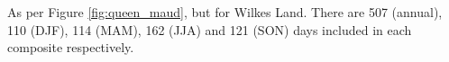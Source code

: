 \label{fig:wilkes}
As per Figure \ref{fig:queen_maud}, but for Wilkes Land. There are 507 (annual), 110 (DJF), 114 (MAM), 162 (JJA) and 121 (SON) days included in each composite respectively.